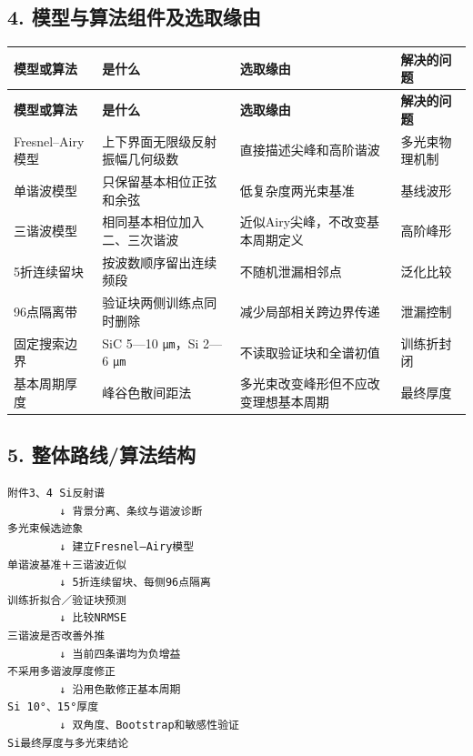 \documentclass[11pt,a4paper]{ctexart}
\begin{document}
\subsection*{4. 模型与算法组件及选取缘由}
\begin{center}
\scriptsize
\begin{longtable}{|>{\raggedright\arraybackslash}p{}|>{\raggedright\arraybackslash}p{}|>{\raggedright\arraybackslash}p{}|>{\raggedright\arraybackslash}p{}|}
\hline
\textbf{模型或算法} & \textbf{是什么} & \textbf{选取缘由} & \textbf{解决的问题} \\ \hline
\endfirsthead
\hline \textbf{模型或算法} & \textbf{是什么} & \textbf{选取缘由} & \textbf{解决的问题} \\ \hline
\endhead
Fresnel–Airy模型 & 上下界面无限级反射振幅几何级数 & 直接描述尖峰和高阶谐波 & 多光束物理机制 \\ \hline
单谐波模型 & 只保留基本相位正弦和余弦 & 低复杂度两光束基准 & 基线波形 \\ \hline
三谐波模型 & 相同基本相位加入二、三次谐波 & 近似Airy尖峰，不改变基本周期定义 & 高阶峰形 \\ \hline
5折连续留块 & 按波数顺序留出连续频段 & 不随机泄漏相邻点 & 泛化比较 \\ \hline
96点隔离带 & 验证块两侧训练点同时删除 & 减少局部相关跨边界传递 & 泄漏控制 \\ \hline
固定搜索边界 & SiC 5—10 \texttt{μm}，Si 2—6 \texttt{μm} & 不读取验证块和全谱初值 & 训练折封闭 \\ \hline
基本周期厚度 & 峰谷色散间距法 & 多光束改变峰形但不应改变理想基本周期 & 最终厚度 \\ \hline
\end{longtable}
\normalsize
\end{center}
\subsection*{5. 整体路线/算法结构}
\begin{lstlisting}
附件3、4 Si反射谱
        ↓ 背景分离、条纹与谐波诊断
多光束候选迹象
        ↓ 建立Fresnel–Airy模型
单谐波基准＋三谐波近似
        ↓ 5折连续留块、每侧96点隔离
训练折拟合／验证块预测
        ↓ 比较NRMSE
三谐波是否改善外推
        ↓ 当前四条谱均为负增益
不采用多谐波厚度修正
        ↓ 沿用色散修正基本周期
Si 10°、15°厚度
        ↓ 双角度、Bootstrap和敏感性验证
Si最终厚度与多光束结论
\end{lstlisting}
\end{document}
